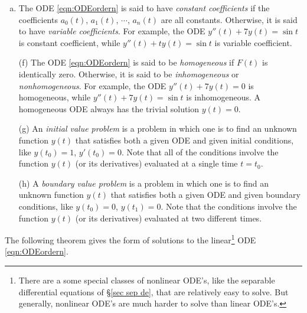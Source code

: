 \begin{defn}
\begin{enumerate}[(a)]
\item %
The ODE \eqref{eqn:ODEordern} is said to have \emph{constant coefficients} if
the coefficients  $a_0(t)$, $a_1(t)$, $\cdots$, $a_n(t)$ are all constants. Otherwise,
it is said to have \emph{variable coefficients}. For example,
the ODE $y''(t)+7y(t)=\sin t$ is constant coefficient, while 
$y''(t)+ty(t)=\sin t$ is variable coefficient.

\item[(f)] %
The ODE \eqref{eqn:ODEordern} is said to be \emph{homogeneous} if $F(t)$ 
is identically zero. Otherwise, it is said to be \emph{inhomogeneous} or 
\emph{nonhomogeneous}. For example, the ODE $y''(t)+7y(t)=0$ is homogeneous, 
while  $y''(t)+7y(t)=\sin t$ is inhomogeneous. A homogeneous ODE always
has the trivial solution $y(t)=0$.

\end{enumerate}
\end{defn}

\addtocounter{theorem}{-1}
\begin{defn}[continued]
\begin{enumerate}[(a)]

\item[(g)] %
An \emph{initial value problem}  is a problem in which one is to find
an unknown function $y(t)$ that satisfies both a given ODE and given
initial conditions, like $y(t_0)=1$, $y'(t_0)=0$. Note that all of the 
conditions involve the function $y(t)$ (or its derivatives) evaluated at 
a single time $t=t_0$.

\item[(h)] %
A \emph{boundary value problem}  is a problem in which one is to find
an unknown function $y(t)$ that satisfies both a given ODE and given
boundary conditions, like $y(t_0)=0$, $y(t_1)=0$. Note that the conditions 
involve the function $y(t)$ (or its derivatives) evaluated at two different 
times. 

\end{enumerate}
\end{defn}


\noindent The following theorem gives the form of solutions to the 
linear\footnote{There are a some special classes of nonlinear ODE's, like the separable differential equations of \S\ref{sec sep de}, that are relatively easy to solve. But generally, nonlinear ODE's are much harder to solve than linear ODE's.} ODE \eqref{eqn:ODEordern}.

